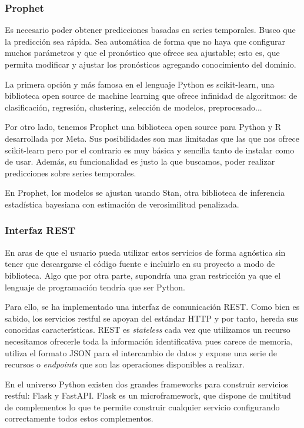 \subsubsection{Prophet}
Es necesario poder obtener predicciones basadas en series temporales. Busco que la predicción sea rápida. Sea automática de forma que no haya que configurar muchos parámetros y que el pronóstico que ofrece sea ajustable; esto es, que permita modificar y ajustar los pronósticos agregando conocimiento del dominio.

La primera opción y más famosa en el lenguaje Python es scikit-learn, una biblioteca open source de machine learning que ofrece infinidad de algoritmos: de clasificación, regresión, clustering, selección de modelos, preprocesado...

Por otro lado, tenemos Prophet una biblioteca open source para Python y R desarrollada por Meta. Sus posibilidades son mas limitadas que las que nos ofrece scikit-learn pero por el contrario es muy básica y sencilla tanto de instalar como de usar. Además, su funcionalidad es justo la que buscamos, poder realizar predicciones sobre series temporales.

En Prophet, los modelos se ajustan usando Stan, otra biblioteca de inferencia estadística bayesiana con estimación de verosimilitud penalizada.

\subsubsection{Interfaz REST}
En aras de que el usuario pueda utilizar estos servicios de forma agnóstica sin tener que descargarse el código fuente e incluirlo en su proyecto a modo de biblioteca. Algo que por otra parte, supondría una gran restricción ya que el lenguaje de programación tendría que ser Python.

Para ello, se ha implementado una interfaz de comunicación REST. Como bien es sabido, los servicios restful se apoyan del estándar HTTP y por tanto, hereda sus conocidas características. REST es \textit{stateless} cada vez que utilizamos un recurso necesitamos ofrecerle toda la información identificativa pues carece de memoria, utiliza el formato JSON para el intercambio de datos y expone una serie de recursos o \textit{endpoints} que son las operaciones disponibles a realizar.

En el universo Python existen dos grandes frameworks para construir servicios restful: Flask y FastAPI.
Flask es un microframework, que dispone de multitud de complementos lo que te permite construir cualquier servicio configurando correctamente todos estos complementos. 

